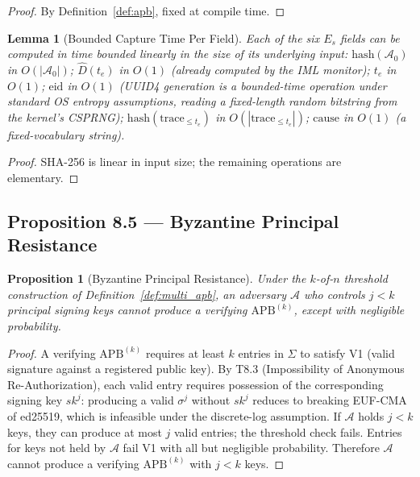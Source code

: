 \documentclass[11pt]{article}
\newtheorem{lemma}[theorem]{Lemma}
\newtheorem{proposition}[theorem]{Proposition}
\newcommand{\Azero}{\mathcal{A}_0}
\newcommand{\Dhat}{\widehat{D}}
\newcommand{\Es}{E_s}
\newcommand{\APB}{\mathrm{APB}}
\begin{document}
\begin{proof}
By Definition~\ref{def:apb}, fixed at compile time.
\end{proof}

\begin{lemma}[Bounded Capture Time Per Field]
\label{lem:bounded_capture}
Each of the six $\Es$ fields can be computed in time bounded
linearly in the size of its underlying input:
$\mathrm{hash}(\Azero)$ in $O(|\Azero|)$;
$\Dhat(t_e)$ in $O(1)$ (already computed by the IML monitor);
$t_e$ in $O(1)$;
$\mathrm{eid}$ in $O(1)$ (UUID4 generation is a bounded-time
operation under standard OS entropy assumptions, reading a fixed-length
random bitstring from the kernel's CSPRNG);
$\mathrm{hash}(\mathrm{trace}_{\le t_e})$ in $O(|\mathrm{trace}_{\le t_e}|)$;
$\mathrm{cause}$ in $O(1)$ (a fixed-vocabulary string).
\end{lemma}

\begin{proof}
SHA-256 is linear in input size; the remaining operations are
elementary.
\end{proof}

\subsection{Proposition 8.5 --- Byzantine Principal Resistance}
\label{sec:p85}

\begin{proposition}[Byzantine Principal Resistance]
\label{prop:byzantine}
Under the $k$-of-$n$ threshold construction of
Definition~\ref{def:multi_apb}, an adversary $\mathcal{A}$ who
controls $j < k$ principal signing keys cannot produce a verifying
$\APB^{(k)}$, except with negligible probability.
\end{proposition}

\begin{proof}
A verifying $\APB^{(k)}$ requires at least $k$ entries in $\Sigma$
to satisfy V1 (valid signature against a registered public key).
By T8.3 (Impossibility of Anonymous Re-Authorization), each valid
entry requires possession of the corresponding signing key $sk^j$:
producing a valid $\sigma^j$ without $sk^j$ reduces to breaking
EUF-CMA of ed25519, which is infeasible under the discrete-log
assumption. If $\mathcal{A}$ holds $j < k$ keys, they can produce at
most $j$ valid entries; the threshold check fails. Entries for keys
not held by $\mathcal{A}$ fail V1 with all but negligible probability.
Therefore $\mathcal{A}$ cannot produce a verifying $\APB^{(k)}$
with $j < k$ keys.
\end{proof}
\end{document}
